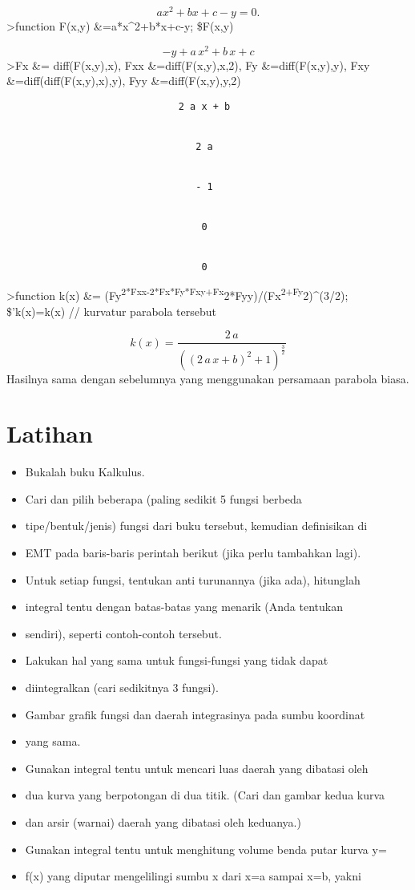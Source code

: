 \documentclass[
]{book}
\begin{document}
\[ax^2+bx+c-y=0.\]\textgreater function F(x,y) \&=a*x\^{}2+b*x+c-y; \$F(x,y)

\[-y+a\,x^2+b\,x+c\]\textgreater Fx \&= diff(F(x,y),x), Fxx \&=diff(F(x,y),x,2), Fy \&=diff(F(x,y),y), Fxy \&=diff(diff(F(x,y),x),y), Fyy \&=diff(F(x,y),y,2)

\begin{verbatim}
                              2 a x + b


                                 2 a


                                 - 1


                                  0


                                  0
\end{verbatim}

\textgreater function k(x) \&= (Fy\textsuperscript{2*Fxx-2*Fx*Fy*Fxy+Fx}2*Fyy)/(Fx\textsuperscript{2+Fy}2)\^{}(3/2); \$'k(x)=k(x) // kurvatur parabola tersebut

\[k\left(x\right)=\frac{2\,a}{\left(\left(2\,a\,x+b\right)^2+1\right)
 ^{\frac{3}{2}}}\]Hasilnya sama dengan sebelumnya yang menggunakan persamaan parabola biasa.

\chapter{Latihan}\label{latihan-3}

\begin{itemize}
\item
  Bukalah buku Kalkulus.
\item
  Cari dan pilih beberapa (paling sedikit 5 fungsi berbeda
\item
  tipe/bentuk/jenis) fungsi dari buku tersebut, kemudian definisikan di
\item
  EMT pada baris-baris perintah berikut (jika perlu tambahkan lagi).
\item
  Untuk setiap fungsi, tentukan anti turunannya (jika ada), hitunglah
\item
  integral tentu dengan batas-batas yang menarik (Anda tentukan
\item
  sendiri), seperti contoh-contoh tersebut.
\item
  Lakukan hal yang sama untuk fungsi-fungsi yang tidak dapat
\item
  diintegralkan (cari sedikitnya 3 fungsi).
\item
  Gambar grafik fungsi dan daerah integrasinya pada sumbu koordinat
\item
  yang sama.
\item
  Gunakan integral tentu untuk mencari luas daerah yang dibatasi oleh
\item
  dua kurva yang berpotongan di dua titik. (Cari dan gambar kedua kurva
\item
  dan arsir (warnai) daerah yang dibatasi oleh keduanya.)
\item
  Gunakan integral tentu untuk menghitung volume benda putar kurva y=
\item
  f(x) yang diputar mengelilingi sumbu x dari x=a sampai x=b, yakni
\end{itemize}
\end{document}
